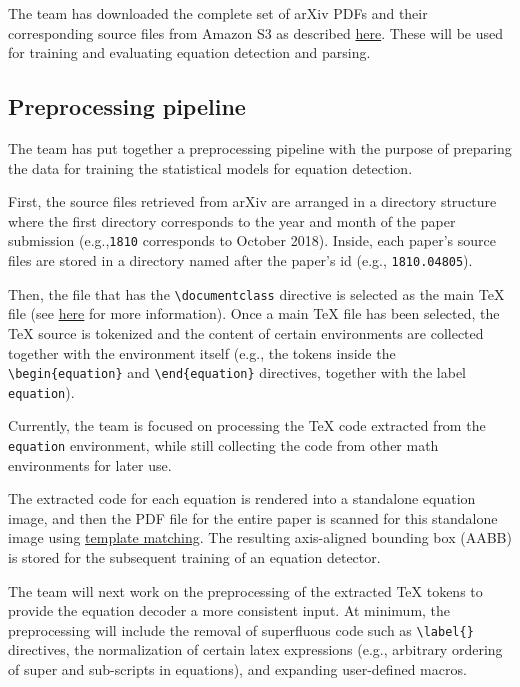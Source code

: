 \documentclass[article, 12pt, oneside]{memoir}
\begin{document}
The team has downloaded the complete set of arXiv PDFs and their
corresponding source files from Amazon S3 as described
\href{https://arxiv.org/help/bulk_data_s3}{here}. These will be used for
training and evaluating equation detection and parsing.

\hypertarget{preprocessing-pipeline}{%
\subsection{Preprocessing pipeline}\label{preprocessing-pipeline}}

The team has put together a preprocessing pipeline with the purpose of
preparing the data for training the statistical models for equation
detection.

First, the source files retrieved from arXiv are arranged in a directory
structure where the first directory corresponds to the year and month of
the paper submission (e.g.,\texttt{1810} corresponds to October 2018).
Inside, each paper's source files are stored in a directory named after
the paper's id (e.g., \texttt{1810.04805}).

Then, the file that has the \texttt{\textbackslash{}documentclass}
directive is selected as the main TeX file (see
\href{https://arxiv.org/help/faq/mistakes\#wrongtex}{here} for more
information). Once a main TeX file has been selected, the TeX source is
tokenized and the content of certain environments are collected together
with the environment itself (e.g., the tokens inside the
\texttt{\textbackslash{}begin\{equation\}} and
\texttt{\textbackslash{}end\{equation\}} directives, together with the
label \texttt{equation}).

Currently, the team is focused on processing the TeX code extracted from
the \texttt{equation} environment, while still collecting the code from
other math environments for later use.

The extracted code for each equation is rendered into a standalone
equation image, and then the PDF file for the entire paper is scanned
for this standalone image using
\href{https://docs.opencv.org/4.0.0/df/dfb/group__imgproc__object.html}{template
matching}. The resulting axis-aligned bounding box (AABB) is stored for
the subsequent training of an equation detector.

The team will next work on the preprocessing of the extracted TeX tokens
to provide the equation decoder a more consistent input. At minimum, the
preprocessing will include the removal of superfluous code such as
\texttt{\textbackslash{}label\{\}} directives, the normalization of
certain latex expressions (e.g., arbitrary ordering of super and
sub-scripts in equations), and expanding user-defined macros.
\end{document}
